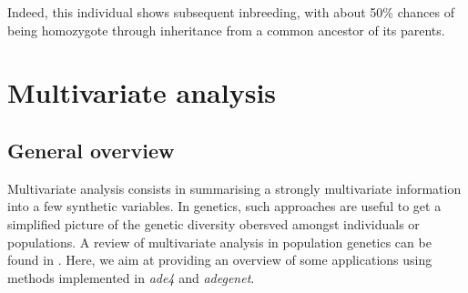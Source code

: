 \documentclass{article}
\begin{document}
\noindent Indeed, this individual shows subsequent inbreeding, with about 50\% chances of being
homozygote through inheritance from a common ancestor of its parents.






\newpage
\section{Multivariate analysis}

\subsection{General overview}

Multivariate analysis consists in summarising a strongly multivariate information into a few
synthetic variables.
In genetics, such approaches are useful to get a simplified picture of the genetic diversity
obersved amongst individuals or populations.
A review of multivariate analysis in population genetics can be found in \cite{tjart10}.
Here, we aim at providing an overview of some applications using methods implemented in \textit{ade4}
and \textit{adegenet}.
\\
\end{document}

